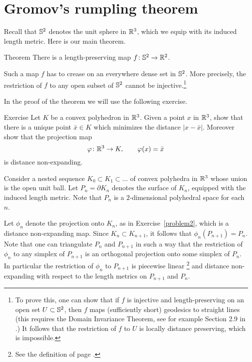 \section{Gromov's rumpling theorem}\label{sec:S^2->R^2}

Recall that $\mathbb{S}^2$ denotes the unit sphere in $\mathbb{R}^3$, which we equip with its induced length metric.  Here is our main theorem.

\begin{thm}{Theorem}\label{thm:S2->R2}
There is a length-preserving map $f\colon\mathbb{S}^2\to\mathbb{R}^2$.
\end{thm}

Such a map $f$ has to crease on an everywhere dense set in $\mathbb{S}^2$.
More precisely,  the restriction of $f$ to any open subset of $\mathbb{S}^2$ cannot be injective.\footnote{To prove this, one can show that if $f$ is injective and length-preserving on an open set $U \subset \mathbb{S}^2$, then $f$ maps (sufficiently short) geodesics to straight lines (this requires the Domain Invariance Theorem, 
see for example Section 2.9 in \cite{alexandrov}.)  It follows that the restriction of $f$ to $U$ is locally distance preserving, which is impossible.
}

In the proof of the theorem we will use the following exercise.

\begin{thm}{Exercise}\label{problem2}
Let $K$ be a convex polyhedron in $\mathbb{R}^3$.
Given a point $x$ in $\mathbb{R}^3$, show that there is a unique point $\bar x\in K$ which minimizes the distance $|x-\bar x|$.
Moreover show that the projection map $$\varphi\colon \mathbb{R}^3 \to K, \qquad \varphi(x) = \bar x$$ is distance non-expanding. 
\end{thm}

Consider a nested
sequence $K_0\subset K_1\subset \dots$ of convex polyhedra in $\mathbb{R}^3$ whose union is the open unit ball.
Let $P_n = \partial K_n$ denotes the surface of $K_n$, equipped with the induced length metric.
Note that $P_n$ is a $2$-dimensional polyhedral space for each $n$.

Let $\phi_n$ denote the projection onto $K_{n}$, 
as in Exercise~\ref{problem2}, which is a distance non-expanding map.
Since $K_{n} \subset K_{n+1}$, it follows that $\phi_n(P_{n+1}) = P_{n}$.
Note that one can triangulate $P_n$ and $P_{n+1}$ in such a way that the restriction of $\phi_n$ to any simplex of $P_{n+1}$ is an orthogonal projection onto some simplex of $P_{n}$.
In particular the restriction of $\phi_n$ to $P_{n+1}$ is piecewise linear%
\footnote{See the definition of page \pageref{page:piecewise linear map}.}
and distance non-expanding with respect to the length metrics on $P_{n+1}$ and $P_n$.




